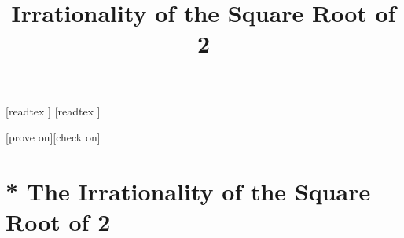 \documentclass{article}
\title{Irrationality of the Square Root of 2}
\author{}
\date{}
\begin{document}
\maketitle

\begin{forthel}

    [readtex ]
    [readtex ]

    [prove on][check on]
  \end{forthel}

\section{* The Irrationality of the Square Root of 2}
\end{document}
